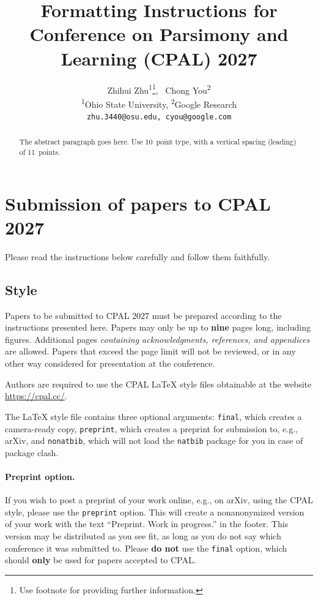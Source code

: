 \documentclass{article}
\title{Formatting Instructions for \\Conference on Parsimony and Learning (CPAL) 2027}
\author{%
  Zhihui Zhu\textsuperscript{1}\thanks{Use footnote for providing further information.}, ~Chong You\textsuperscript{2} \\
  \textsuperscript{1}Ohio State University, \textsuperscript{2}Google Research\\
  \texttt{zhu.3440@osu.edu, cyou@google.com}
}
\begin{document}
\maketitle


\begin{abstract}
  The abstract paragraph goes here. Use 10~point type, with a vertical
  spacing (leading) of 11~points. 
\end{abstract}


\section{Submission of papers to CPAL 2027}


Please read the instructions below carefully and follow them faithfully. 


\subsection{Style}


Papers to be submitted to CPAL 2027 must be prepared according to the
instructions presented here. Papers may only be up to {\bf nine} pages long,
including figures. Additional pages \emph{containing acknowledgments,
references, and appendices} are allowed. Papers that exceed the page limit will not be
reviewed, or in any other way considered for presentation at the conference.


Authors are required to use the CPAL \LaTeX{} style files obtainable at the website \url{https://cpal.cc/}.




The \LaTeX{} style file contains three optional arguments: \verb+final+, which
creates a camera-ready copy, \verb+preprint+, which creates a preprint for
submission to, e.g., arXiv, and \verb+nonatbib+, which will not load the
\verb+natbib+ package for you in case of package clash.


\paragraph{Preprint option.}
If you wish to post a preprint of your work online, e.g., on arXiv, using the
CPAL style, please use the \verb+preprint+ option. This will create a
nonanonymized version of your work with the text ``Preprint. Work in progress.''
in the footer. This version may be distributed as you see fit, as long as you do not say which conference it was submitted to. Please \textbf{do
  not} use the \verb+final+ option, which should \textbf{only} be used for
papers accepted to CPAL. 
\end{document}
